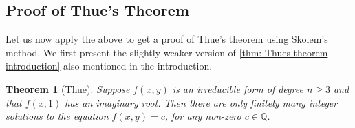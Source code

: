 \documentclass{article}
\newtheorem{theorem}{Theorem}[section]
\newcommand{\mbb}[1]{\mathbb{#1}}
\numberwithin{equation}{section}
\begin{document}

\subsection{Proof of Thue's Theorem}
Let us now apply the above to get a proof of Thue's theorem using Skolem's method. We first present the slightly weaker version of \cref{thm: Thues theorem introduction} also mentioned in the introduction.

\begin{theorem}[Thue]\label{thm: Thues theorem}
    Suppose $f(x,y)$ is an irreducible form of degree $n \geq 3$ and that $f(x,1)$ has an imaginary root. Then there are only finitely many integer solutions to the equation $f(x,y) = c$, for any non-zero $c \in \mbb{Q}$.
\end{theorem}
\end{document}
